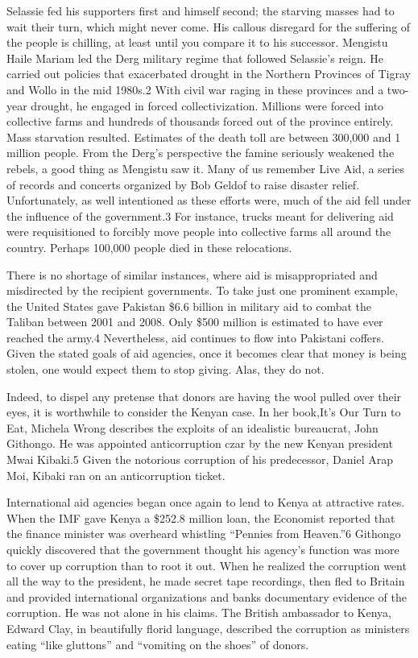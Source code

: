 \documentclass[10pt]{article}
\begin{document}
{\large Selassie fed his supporters first and himself second; the starving
masses had to wait their turn, which might never come. His callous disregard for
the suffering of the people is chilling, at least until you compare it to his
successor. Mengistu Haile Mariam led the Derg military regime that followed
Selassie's reign. He carried out policies that exacerbated drought in the
Northern Provinces of Tigray and Wollo in the mid 1980s.2 With civil war raging
in these provinces and a two-year drought, he engaged in forced collectivization.
Millions were forced into collective farms and hundreds of thousands forced out
of the province entirely. Mass starvation resulted. Estimates of the death toll
are between 300,000 and 1 million people. From the Derg's perspective the famine
seriously weakened the rebels, a good thing as Mengistu saw it. Many of us
remember Live Aid, a series of records and concerts organized by Bob Geldof to
raise disaster relief. Unfortunately, as well intentioned as these efforts were,
much of the aid fell under the influence of the government.3 For instance, trucks
meant for delivering aid were requisitioned to forcibly move people into
collective farms all around the country. Perhaps 100,000 people died in these
relocations.}

{\large There is no shortage of similar instances, where aid is misappropriated
and misdirected by the recipient governments. To take just one prominent example,
the United States gave Pakistan \$6.6 billion in military aid to combat the
Taliban between 2001 and 2008. Only \$500 million is estimated to have ever
reached the army.4 Nevertheless, aid continues to flow into Pakistani coffers.
Given the stated goals of aid agencies, once it becomes clear that money is being
stolen, one would expect them to stop giving. Alas, they do not.}

{\large Indeed, to dispel any pretense that donors are having the wool pulled
over their eyes, it is worthwhile to consider the Kenyan case. In her book,It's
Our Turn to Eat, Michela Wrong describes the exploits of an idealistic
bureaucrat, John Githongo. He was appointed anticorruption czar by the new Kenyan
president Mwai Kibaki.5 Given the notorious corruption of his predecessor, Daniel
Arap Moi, Kibaki ran on an anticorruption ticket.}

{\large International aid agencies began once again to lend to Kenya at
attractive rates. When the IMF gave Kenya a \$252.8 million loan, the Economist
reported that the finance minister was overheard whistling ``Pennies from
Heaven.''6 Githongo quickly discovered that the government thought his agency's
function was more to cover up corruption than to root it out. When he realized
the corruption went all the way to the president, he made secret tape recordings,
then fled to Britain and provided international organizations and banks
documentary evidence of the corruption. He was not alone in his claims. The
British ambassador to Kenya, Edward Clay, in beautifully florid language,
described the corruption as ministers eating ``like gluttons'' and ``vomiting on
the shoes'' of donors.}
\end{document}
